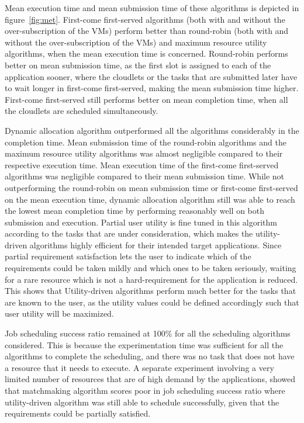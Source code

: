 \documentclass[times, 10pt,twocolumn]{article}
\begin{document}
Mean execution time and mean submission time of these algorithms is depicted in figure~\ref{fig:met}. First-come first-served algorithms (both with and without the over-subscription of the VMs) perform better than round-robin (both with and without the over-subscription of the VMs) and maximum resource utility algorithms, when the mean execution time is concerned. Round-robin performs better on mean submission time, as the first slot is assigned to each of the application sooner, where the cloudlets or the tasks that are submitted later have to wait longer in first-come first-served, making the mean submission time higher. First-come first-served still performs better on mean completion time, when all the cloudlets are scheduled simultaneously.

Dynamic allocation algorithm outperformed all the algorithms considerably in the completion time. Mean submission time of the round-robin algorithms and the maximum resource utility algorithms was almost negligible compared to their respective execution time. Mean execution time of the first-come first-served algorithms was negligible compared to their mean submission time. While not outperforming the round-robin on mean submission time or first-come first-served on the mean execution time, dynamic allocation algorithm still was able to reach the lowest mean completion time by performing reasonably well on both submission and execution. Partial user utility is fine tuned in this algorithm according to the tasks that are under consideration, which makes the utility-driven algorithms highly efficient for their intended target applications. Since partial requirement satisfaction lets the user to indicate which of the requirements could be taken mildly and which ones to be taken seriously, waiting for a rare resource which is not a hard-requirement for the application is reduced. This shows that Utility-driven algorithms perform much better for the tasks that are known to the user, as the utility values could be defined accordingly such that user utility will be maximized. 

Job scheduling success ratio remained at 100\% for all the scheduling algorithms considered. This is because the experimentation time was sufficient for all the algorithms to complete the scheduling, and there was no task that does not have a resource that it needs to execute. A separate experiment involving a very limited number of resources that are of high demand by the applications, showed that matchmaking algorithm scores poor in job scheduling success ratio where utility-driven algorithm was still able to schedule successfully, given that the requirements could be partially satisfied.
\end{document}
